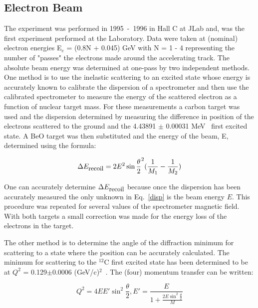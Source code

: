 \documentclass[aps,prl,twocolumn,showpacs,amsmath,amssymb,floats]{revtex4}
\begin{document}
\subsection*{Electron Beam}
The experiment was performed in 1995~-~1996 in Hall C at JLab and, was the first experiment performed at the Laboratory.  Data were taken at (nominal) 
electron energies E$_e$ = (0.8N + 0.045) GeV with N = 1 - 4 representing the 
number of "passes" the electrons made around the accelerating track.  The 
absolute beam energy was determined at one-pass by two independent methods.  One 
method is to use the inelastic scattering to an excited state whose energy is 
accurately known to calibrate the dispersion of a spectrometer and then use 
the calibrated spectrometer to measure the energy of the scattered electron as a function of nuclear target mass.  For 
these measurements a carbon target was used and the dispersion determined by 
measuring the difference in position of the electrons scattered to the ground 
and the 4.43891 $\pm$ 0.00031 MeV~\cite{offerman91} first excited state.  A BeO 
target was then substituted and the energy of the beam, E, determined using the 
formula:

\begin{equation}
\Delta E_{\mbox{\small recoil}} = 2E^2\sin{\frac{\theta}{2}}^2(\frac{1}{M_1}-
\frac{1}{M_2})
\label{disp}
\end{equation}
                           

One can accurately determine $\Delta E_{\mbox{\small recoil}}$  because once the 
dispersion 
has been accurately measured the only unknown in Eq.~\ref{disp} is the beam 
energy $E$.  This procedure was repeated for several values of the spectrometer magnetic field.  With both 
targets a small correction was made for the energy loss of the electrons in the 
target.

The other method is to determine the angle of the diffraction minimum for 
scattering to a state where the position can be accurately calculated.  The 
minimum for scattering to the $^{12}$C first excited state has been determined 
to be at $Q^2$ = 0.129$\pm$0.0006 (GeV/c)$^2$~\cite{fas85}.  The (four) momentum 
transfer can be written:                                         

\begin{equation}
Q^2=4EE'\sin^2{\frac{\theta}{2}}, E'= \frac{E}{1 + 
\frac{2E\sin^2{\frac{\theta}{2}}}{M}}
\label{qande}
\end{equation}
\end{document}
